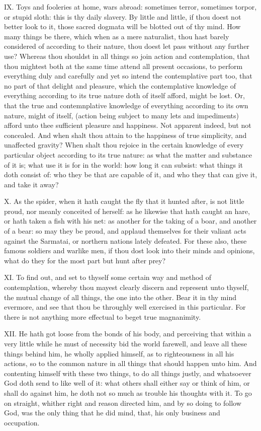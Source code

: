 IX. Toys and fooleries at home, wars abroad: sometimes terror, sometimes
torpor, or stupid sloth: this is thy daily slavery. By little and little,
if thou doest not better look to it, those sacred dogmata will be blotted
out of thy mind. How many things be there, which when as a mere
naturalist, thou hast barely considered of according to their nature, thou
doest let pass without any further use? Whereas thou shouldst in all
things so join action and contemplation, that thou mightest both at the
same time attend all present occasions, to perform everything duly and
carefully and yet so intend the contemplative part too, that no part of
that delight and pleasure, which the contemplative knowledge of everything
according to its true nature doth of itself afford, might be lost. Or,
that the true and contemnplative knowledge of everything according to its
own nature, might of itself, (action being subject to many lets and
impediments) afford unto thee sufficient pleasure and happiness. Not
apparent indeed, but not concealed. And when shalt thou attain to the
happiness of true simplicity, and unaffected gravity? When shalt thou
rejoice in the certain knowledge of every particular object according to
its true nature: as what the matter and substance of it is; what use it is
for in the world: how long it can subsist: what things it doth consist of:
who they be that are capable of it, and who they that can give it, and
take it away?

X. As the spider, when it hath caught the fly that it hunted after, is
not little proud, nor meanly conceited of herself: as he likewise that
hath caught an hare, or hath taken a fish with his net: as another for the
taking of a boar, and another of a bear: so may they be proud, and applaud
themselves for their valiant acts against the Sarmatai, or northern
nations lately defeated. For these also, these famous soldiers and warlike
men, if thou dost look into their minds and opinions, what do they for the
most part but hunt after prey?

XI. To find out, and set to thyself some certain way and method of
contemplation, whereby thou mayest clearly discern and represent unto
thyself, the mutual change of all things, the one into the other. Bear it
in thy mind evermore, and see that thou be throughly well exercised in
this particular. For there is not anything more effectual to beget true
magnanimity.

XII. He hath got loose from the bonds of his body, and perceiving that
within a very little while he must of necessity bid the world farewell,
and leave all these things behind him, he wholly applied himself, as to
righteousness in all his actions, so to the common nature in all things
that should happen unto him. And contenting himself with these two things,
to do all things justly, and whatsoever God doth send to like well of it:
what others shall either say or think of him, or shall do against him, he
doth not so much as trouble his thoughts with it. To go on straight,
whither right and reason directed him, and by so doing to follow God, was
the only thing that he did mind, that, his only business and occupation.

